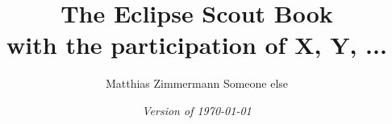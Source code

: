 
\author{
  Matthias Zimmermann\quad
  Someone else
}
\title{\Huge\bf The Eclipse Scout Book\\[1ex]
\small with the participation of X, Y, ... }
\ifpdf
  \isodate
\fi
\date{\emph{Version of \today}}
\maketitle

